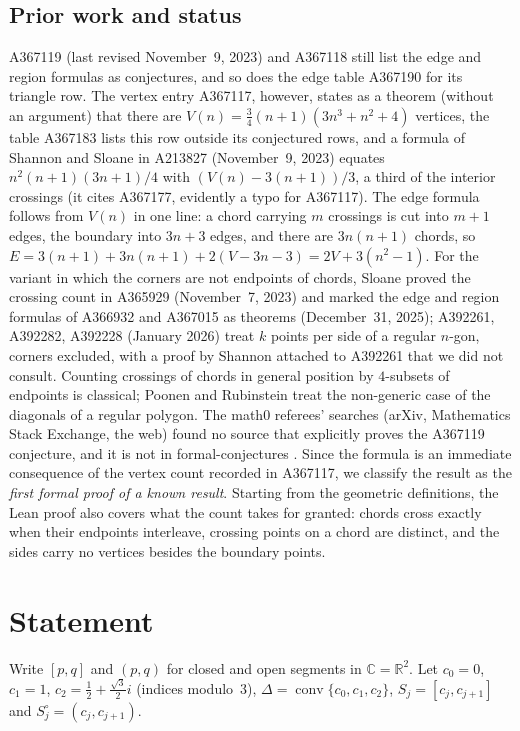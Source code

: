 \documentclass[11pt]{amsart}
\theoremstyle{plain}
\theoremstyle{definition}
\newcommand{\C}{\mathbb{C}}
\begin{document}
\subsection*{Prior work and status}
A367119 (last revised November~9, 2023) and A367118 still list the edge and region formulas as conjectures, and so does the edge table A367190 \cite{A367190} for its triangle row. The vertex entry A367117, however, states as a theorem (without an argument) that there are $V(n)=\frac34(n+1)(3n^3+n^2+4)$ vertices, the table A367183 \cite{A367183} lists this row outside its conjectured rows, and a formula of Shannon and Sloane in A213827 \cite{A213827} (November~9, 2023) equates $n^2(n+1)(3n+1)/4$ with $(V(n)-3(n+1))/3$, a third of the interior crossings (it cites A367177, evidently a typo for A367117). The edge formula follows from $V(n)$ in one line: a chord carrying $m$ crossings is cut into $m+1$ edges, the boundary into $3n+3$ edges, and there are $3n(n+1)$ chords, so $E=3(n+1)+3n(n+1)+2(V-3n-3)=2V+3(n^2-1)$.
For the variant in which the corners are not endpoints of chords, Sloane proved the crossing count in A365929 \cite{A365929} (November~7, 2023) and marked the edge and region formulas of A366932 and A367015 \cite{A366932,A367015} as theorems (December~31, 2025); A392261, A392282, A392228 (January 2026) treat $k$ points per side of a regular $n$-gon, corners excluded, with a proof by Shannon attached to A392261 \cite{A392261} that we did not consult. Counting crossings of chords in general position by $4$-subsets of endpoints is classical; Poonen and Rubinstein \cite{PR} treat the non-generic case of the diagonals of a regular polygon. The math0 referees' searches (arXiv, Mathematics Stack Exchange, the web) found no source that explicitly proves the A367119 conjecture, and it is not in formal-conjectures \cite{FC}.
Since the formula is an immediate consequence of the vertex count recorded in A367117, we classify the result as the \emph{first formal proof of a known result}. Starting from the geometric definitions, the Lean proof also covers what the count takes for granted: chords cross exactly when their endpoints interleave, crossing points on a chord are distinct, and the sides carry no vertices besides the boundary points.

\section{Statement}\label{sec:statement}

Write $[p,q]$ and $(p,q)$ for closed and open segments in $\C=\mathbb{R}^2$. Let $c_0=0$, $c_1=1$, $c_2=\frac12+\frac{\sqrt3}{2}i$ (indices modulo~$3$), $\Delta=\operatorname{conv}\{c_0,c_1,c_2\}$, $S_j=[c_j,c_{j+1}]$ and $S_j^\circ=(c_j,c_{j+1})$.
\end{document}
